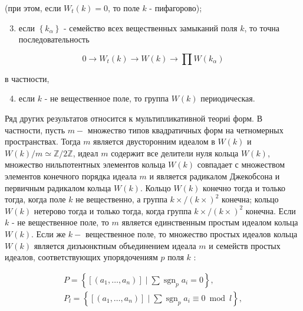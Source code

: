 \documentclass[10pt]{article}
\begin{document}
(при этом, если $W_{t}(k)=0$, то поле $k$ - пифагорово);



\begin{enumerate}

  \setcounter{enumi}{2}

  \item если $\left\{k_{\alpha}\right\}$ - семейство всех вещественных замыканий поля $k$, то точна последовательность

\end{enumerate}



\[

0 \longrightarrow W_{t}(k) \longrightarrow W(k) \longrightarrow \prod W\left(k_{\alpha}\right)

\]



в частности,



\begin{enumerate}

  \setcounter{enumi}{3}

  \item если $k$ - не вещественное поле, то группа $W(k)$ периодическая.

\end{enumerate}



Ряд других результатов относится к мультипликативной теориі форм. В частности, пусть $m-$ множество типов квадратичных форм на четномерных пространствах. Тогда $m$ является двусторонним идеалом в $W(k)$ и $W(k) / m \simeq \mathbb{Z} / 2 \mathbb{Z}$, идеал $m$ содержит все делители нуля кольца $W(k)$, множество нильпотентных элементов кольца $W(k)$ совпадает с множеством элементов конечного порядка идеала $m$ и является радикалом Джекобсона и первичным радикалом кольца $W(k)$. Кольцо $W(k)$ конечно тогда и только тогда, когда поле $k$ не вещественно, а группа $k \times /(k \times)^{2}$ конечна; кольцо $W(k)$ нетерово тогда и только тогда, когда группа $k \times /(k \times)^{2}$ конечна. Если $k$ - не вещественное поле, то $m$ является единственным простым идеалом кольца $W(k)$. Если же $k-$ вещественное поле, то множество простых идеалов кольца $W(k)$ является дизъюнктным объединением идеала $m$ и семейств простых идеалов, соответствующих упорядочениям $p$ поля $k$ :



\[

\begin{gathered}

P=\left\{\left[\left(a_{1}, \ldots, a_{n}\right)\right] \mid \sum \operatorname{sgn}_{p} a_{i}=0\right\}, \\

P_{l}=\left\{\left[\left(a_{1}, \ldots, a_{n}\right)\right] \mid \sum \operatorname{sgn}_{p} a_{i} \equiv 0 \bmod l\right\},

\end{gathered}

\]
\end{document}
